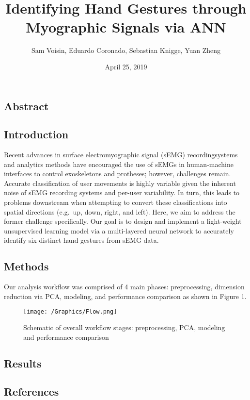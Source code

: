 \documentclass[]{article}
\title{Identifying Hand Gestures through Myographic Signals via ANN}
\author{Sam Voisin, Eduardo Coronado, Sebastian Knigge, Yuan Zheng}
\date{April 25, 2019}
\begin{document}
\maketitle

\subsection{Abstract}\label{abstract}

\subsection{Introduction}\label{introduction}

Recent advances in surface electromyographic signal (sEMG)
recordingsystems and analytics methods have encouraged the use of sEMGs
in human-machine interfaces to control exoskeletons and protheses;
however, challenges remain. Accurate classification of user movements is
highly variable given the inherent noise of sEMG recording systems and
per-user variability. In turn, this leads to problems downstream when
attempting to convert these classifications into spatial directions
(e.g.~up, down, right, and left). Here, we aim to address the former
challenge specifically. Our goal is to design and implement a
light-weight unsupervised learning model via a multi-layered neural
network to accurately identify six distinct hand gestures from sEMG
data.

\subsection{Methods}\label{methods}

Our analysis workflow was comprised of 4 main phases: preprocessing,
dimension reduction via PCA, modeling, and performance comparison as
shown in Figure 1.

\begin{figure}
\centering
\texttt{[image: /Graphics/Flow.png]}
\caption{Schematic of overall workflow stages: preprocessing, PCA,
modeling and performance comparison}
\end{figure}

\subsection{Results}\label{results}

\subsection{References}\label{references}
\end{document}
